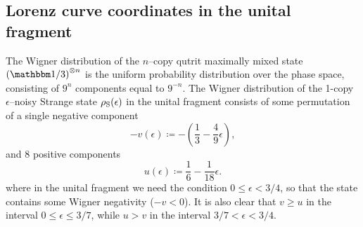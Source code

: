 \subsection{Lorenz curve coordinates in the unital fragment}\label{app:lcsu_coord}
The Wigner distribution of the $n$--copy qutrit maximally mixed state $\left(\id/3\right)^{\otimes n}$ is the uniform probability distribution over the phase space, consisting of $9^n$ components equal to $9^{-n}$.
The Wigner distribution of the 1-copy $\epsilon$--noisy Strange state $\rho_{\rm{S}}(\epsilon)$ in the unital fragment consists of some permutation of a single negative component
\begin{equation}
	- v(\epsilon) \coloneqq - \left( \frac{1}{3} -\frac{4}{9}\epsilon \right),
\end{equation} 
and $8$ positive components
\begin{equation}
	u(\epsilon) \coloneqq \frac{1}{6} -\frac{1}{18}\epsilon.
\end{equation}
where in the unital fragment we need the condition $0 \leq \epsilon < 3/4$, so that the state contains some Wigner negativity ($-v < 0$).
It is also clear that $v \geq u$ in the interval $0 \leq \epsilon \leq 3/7$, while $u > v$ in the interval $3/7 < \epsilon < 3/4$.

